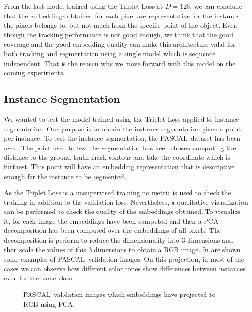 From the last model trained using the Triplet Loss at $D=128$, we can conclude that the embeddings obtained for each pixel are representative for the instance the pixels belongs to, but not much from the specific point of the object.
Even though the tracking performance is not good enough, we think that the good coverage and the good embedding quality can make this architecture valid for both tracking and segmentation using a single model which is sequence independent.
That is the reason why we move forward with this model on the coming experiments.



\subsection{Instance Segmentation}

We wanted to test the model trained using the Triplet Loss applied to instance segmentation.
Our purpose is to obtain the instance segmentation given a point per instance.
To test the instance segmentation, the PASCAL~\pascal dataset has been used.
The point used to test the segmentation has been chosen computing the distance to the ground truth mask contour and take the coordinate which is furthest.
This point will have an embedding representation that is descriptive enough for the instance to be segmented.

As the Triplet Loss is a unsupervised training no metric is used to check the training in addition to the validation loss.
Nevertheless, a qualitative visualization can be performed to check the quality of the embeddings obtained.
To visualize it, for each image the embeddings have been computed and then a PCA decomposition has been computed over the embeddings of all pixels.
The decomposition is perform to reduce the dimensionality into 3 dimensions and then scale the values of this 3 dimensions to obtain a RGB image.
In  are shown some examples of PASCAL~\pascal validation images.
On this projection, in most of the cases we can observe how different color tones show differences between instances even for the same class.

\begin{figure}[h]
  \centering
  \caption{PASCAL~\pascal validation images which embeddings have projected to RGB using PCA. }
  \label{fig:pca_embeddings}
\end{figure}

